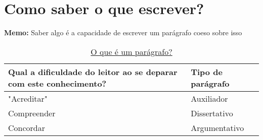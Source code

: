 \documentclass[11pt]{article}
\begin{document}
\section*{Como saber o que escrever?}
\label{sec:org416a854}


\textbf{Memo:} Saber algo é a capacidade de escrever um parágrafo coeso sobre isso

\begin{table}[htbp]
\caption{\href{https://www.youtube.com/watch?v=vECQOychZyY}{O que é um parágrafo?}}
\centering
\begin{tabular}{ll}
\hline
Qual a dificuldade do leitor ao se deparar com este conhecimento? & Tipo de parágrafo\\
\hline
"Acreditar" & Auxiliador\\
Compreender & Dissertativo\\
Concordar & Argumentativo\\
\hline
\end{tabular}
\end{table}
\end{document}
